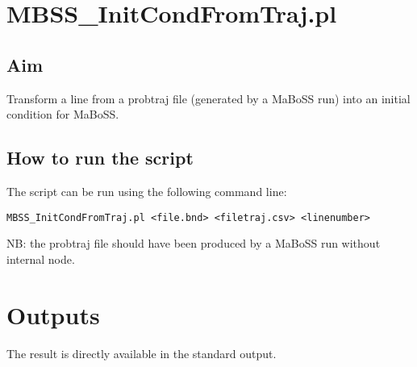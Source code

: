 \documentclass{article}
\begin{document}
\section*{MBSS\_InitCondFromTraj.pl}
\subsection*{Aim}
Transform a line from a probtraj file (generated by a MaBoSS run) into an initial condition for MaBoSS.

\subsection*{How to run the script}
The script can be run using the following command line: 

\begin{verbatim}
MBSS_InitCondFromTraj.pl <file.bnd> <filetraj.csv> <linenumber>
\end{verbatim}

NB: the probtraj file should have been produced by a MaBoSS run without internal node.

\section*{Outputs}
The result is directly available in the standard output.
\end{document}
